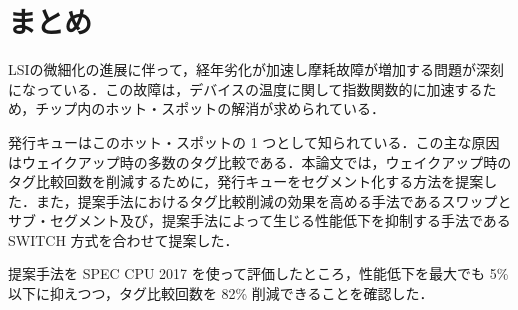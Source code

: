 
\chapter{まとめ}
\label{sec:summary}
LSIの微細化の進展に伴って，経年劣化が加速し摩耗故障が増加する問題が深刻になっている．この故障は，デバイスの温度に関して指数関数的に加速するため，チップ内のホット・スポットの解消が求められている．

発行キューはこのホット・スポットの 1 つとして知られている．この主な原因はウェイクアップ時の多数のタグ比較である．本論文では，ウェイクアップ時のタグ比較回数を削減するために，発行キューをセグメント化する方法を提案した．また，提案手法におけるタグ比較削減の効果を高める手法であるスワップとサブ・セグメント及び，提案手法によって生じる性能低下を抑制する手法である SWITCH 方式を合わせて提案した．

提案手法を SPEC CPU 2017 を使って評価したところ，性能低下を最大でも 5\% 以下に抑えつつ，タグ比較回数を 82\% 削減できることを確認した．
